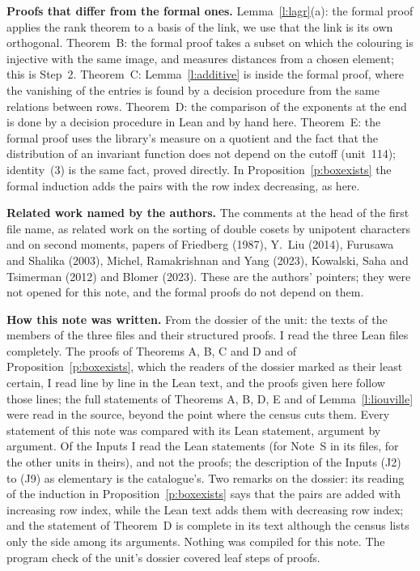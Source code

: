 \documentclass[11pt,a4paper]{article}
\newcommand{\subhead}[1]{\par\addvspace{9pt plus 2pt}\Needspace{4\baselineskip}\noindent\textbf{#1}\enspace\ignorespaces}
\theoremstyle{plainx}
\theoremstyle{uprightx}
\begin{document}
\subhead{Proofs that differ from the formal ones.} Lemma~\ref{l:lagr}(a): the formal proof applies the rank
theorem to a basis of the link, we use that the link is its own orthogonal. Theorem~B: the formal proof takes a
subset on which the colouring is injective with the same image, and measures distances from a chosen element;
this is Step~2. Theorem~C: Lemma~\ref{l:additive} is inside the formal proof, where the vanishing of the entries
is found by a decision procedure from the same relations between rows. Theorem~D: the comparison of the
exponents at the end is done by a decision procedure in Lean and by hand here. Theorem~E: the formal proof uses
the library's measure on a quotient and the fact that the distribution of an invariant function does not
depend on the cutoff (unit~114); identity~(3) is the same fact, proved directly. In Proposition~\ref{p:boxexists}
the formal induction adds the pairs with the row index decreasing, as here.

\subhead{Related work named by the authors.} The comments at the head of the first file name, as related
work on the sorting of double cosets by unipotent characters and on second moments, papers of Friedberg (1987), Y.~Liu
(2014), Furusawa and Shalika (2003), Michel, Ramakrishnan and Yang (2023), Kowalski, Saha and Tsimerman (2012)
and Blomer (2023). These are the authors' pointers; they were not opened for this note, and the formal proofs
do not depend on them.

\subhead{How this note was written.} From the dossier of the unit: the texts of the members of the three files
and their structured proofs. I read the three Lean files completely. The proofs of Theorems A, B, C and D and of
Proposition~\ref{p:boxexists}, which the readers of the dossier marked as their least certain, I read line by
line in the Lean text, and the proofs given here follow those lines; the full statements of Theorems A, B, D, E
and of Lemma~\ref{l:liouville} were read in the source, beyond the point where the census cuts them. Every
statement of this note was compared with its Lean statement, argument by argument. Of the Inputs I read the
Lean statements (for Note~S in its files, for the other units in theirs), and not the proofs; the description of
the Inputs (J2) to (J9) as elementary is the catalogue's. Two remarks on the dossier: its reading of the
induction in Proposition~\ref{p:boxexists} says that the pairs are added with increasing row index, while the Lean
text adds them with decreasing row index; and the statement of Theorem~D is complete in its text although the
census lists only the side among its arguments. Nothing was compiled for this note. The program check of the
unit's dossier covered \UnitSteps{} leaf steps of \UnitProofs{} proofs.
\end{document}

